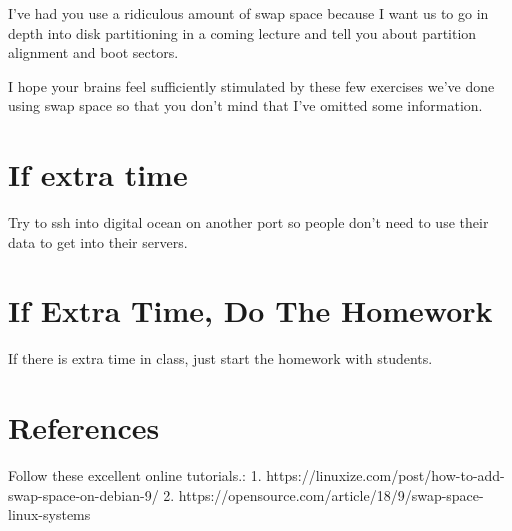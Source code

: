 \documentclass[10pt]{article}
\begin{document}
I've had you use a ridiculous amount of swap space because I want us to go in depth into disk partitioning in a coming lecture and tell you about partition alignment and boot sectors. 

I hope your brains feel sufficiently stimulated by these few exercises we've done using swap space so that you don't mind that I've omitted some information.

\section{If extra time}
Try to ssh into digital ocean on another port so people don't need to use their data to get into their servers.

\section{If Extra Time, Do The Homework}
If there is extra time in class, just start the homework with students.

\section{References}
Follow these excellent online tutorials.:
1. https://linuxize.com/post/how-to-add-swap-space-on-debian-9/
2. https://opensource.com/article/18/9/swap-space-linux-systems
\end{document}
